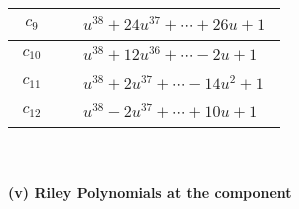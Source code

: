 \documentclass[1p]{elsarticle_modified}
\theoremstyle{definition}
\begin{document}
\begin{tabular}{m{50pt}|m{274pt}}
\hline $$\begin{aligned}c_{9}\end{aligned}$$&$\begin{aligned}
&u^{38}+24 u^{37}+\cdots+26 u+1
\end{aligned}$\\
\hline $$\begin{aligned}c_{10}\end{aligned}$$&$\begin{aligned}
&u^{38}+12 u^{36}+\cdots-2 u+1
\end{aligned}$\\
\hline $$\begin{aligned}c_{11}\end{aligned}$$&$\begin{aligned}
&u^{38}+2 u^{37}+\cdots-14 u^2+1
\end{aligned}$\\
\hline $$\begin{aligned}c_{12}\end{aligned}$$&$\begin{aligned}
&u^{38}-2 u^{37}+\cdots+10 u+1
\end{aligned}$\\
\hline
\end{tabular}\\~\\
\newpage\renewcommand{\arraystretch}{1}
\flushleft \textbf{(v) Riley Polynomials at the component}\newline \\
\end{document}
